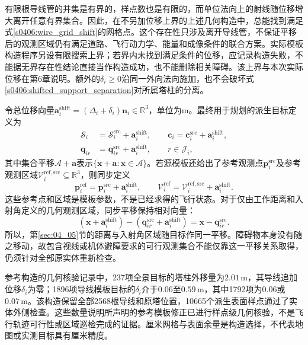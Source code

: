 有限根导线管的并集是有界的，样点数也是有限的，而单位法向上的射线随位移增大离开任意有界集合。因此，在不另加位移上界的上述几何构造中，总能找到满足式\eqref{s0406:wire_grid_shift}的网格点。这个存在性只涉及离开导线管，不保证平移后的观测区域仍有满足道路、飞行动力学、能量和成像条件的联合方案。实际模板构造程序另设有限搜索上界；若界内未找到满足条件的位移，应记录构造失败，不能据无界存在性结论直接当作构造成功，也不能删除相关障碍。该上界与本次实际位移在第6章说明。额外的$\delta_i\ge0$沿同一外向法向施加，也不会破坏式\eqref{s0406:shifted_support_separation}对所属塔柱的分离。

令总位移向量$\mathbf a_i^{\mathrm{shift}}=(\Delta_i+\delta_i)\mathbf n_i\in\mathbb R^3$，单位为$\mathrm m$。最终用于规划的派生目标定义为
\begin{equation}
 \begin{split}
 \mathcal S_i&=\mathcal S_i^{\mathrm{src}}+\mathbf a_i^{\mathrm{shift}},\qquad
 \mathbf c_i=\mathbf c_i^{\mathrm{src}}+\mathbf a_i^{\mathrm{shift}},\\
 \mathbf q_{ir}&=\mathbf q_{ir}^{\mathrm{src}}+\mathbf a_i^{\mathrm{shift}},
 \qquad r\in\mathcal J_i,
 \end{split}
 \label{s0406:derived_target_geometry}
\end{equation}
其中集合平移$\mathcal A+\mathbf a$表示$\{\mathbf x+\mathbf a:\mathbf x\in\mathcal A\}$。若源模板还给出了参考观测点$\mathbf p_i^{\mathrm{src}}$及参考观测区域$\mathcal V_i^{\mathrm{ref,src}}\subseteq\mathbb R^3$，则同步定义
\begin{equation}
 \mathbf p_i^{\mathrm{ref}}
 =\mathbf p_i^{\mathrm{src}}+\mathbf a_i^{\mathrm{shift}},
 \qquad
 \mathcal V_i^{\mathrm{ref}}
 =\mathcal V_i^{\mathrm{ref,src}}+\mathbf a_i^{\mathrm{shift}}.
 \label{s0406:reference_region_shift}
\end{equation}
这些参考点和区域是模板参数，不是已经求得的飞行状态。对于仅由工作距离和入射角定义的几何观测区域，同步平移保持相对向量：
\begin{equation}
 (\mathbf x+\mathbf a_i^{\mathrm{shift}})
 -(\mathbf q_{ir}^{\mathrm{src}}+\mathbf a_i^{\mathrm{shift}})
 =\mathbf x-\mathbf q_{ir}^{\mathrm{src}}.
 \label{s0406:relative_geometry_preserved}
\end{equation}
所以，第\ref{sec:04_05}节的距离与入射角区域随目标作同一平移。障碍物本身没有随之移动，故包含视线或机体避障要求的可行观测集合不能仅靠这一平移关系取得，仍须针对全部原实体重新检查。

参考构造的几何核验记录中，237项全景目标的塔柱外移量为$2.01\,\mathrm m$，其导线追加位移$\delta_i$为零；1896项导线模板目标的$\delta_i$介于$0.06$至$0.59\,\mathrm m$，其中1792项为$0.06$或$0.07\,\mathrm m$。该构造保留全部2568根导线和原塔位置，10665个派生表面样点通过了实体外侧检查。这些数量说明所声明的参考模板修正已进行样点级几何核验，不是飞行轨迹可行性或区域巡检完成的证据。厘米网格与表面余量是构造选择，不代表地图或实测目标具有厘米精度。

